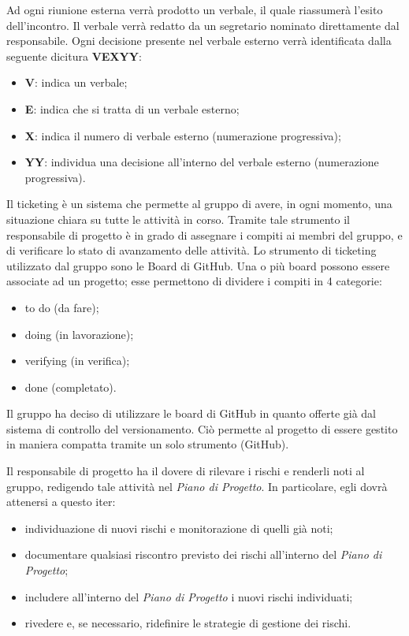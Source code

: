 				Ad ogni riunione esterna verrà prodotto un verbale, il quale riassumerà l'esito dell'incontro. Il verbale verrà redatto da un segretario nominato direttamente dal responsabile. Ogni decisione presente nel verbale esterno verrà identificata dalla seguente dicitura \textbf{VEXYY}:
				\begin{itemize}
					\item\textbf{V}: indica un verbale;
					\item\textbf{E}: indica che si tratta di un verbale esterno;
					\item\textbf{X}: indica il numero di verbale esterno (numerazione progressiva);
					\item\textbf{YY}: individua una decisione all'interno del verbale esterno (numerazione progressiva).
				\end{itemize}
			
			
			
				Il ticketing è un sistema che permette al gruppo di avere, in ogni momento, una situazione chiara su tutte le attività in corso. Tramite tale strumento il responsabile di progetto è in grado di assegnare i compiti ai membri del gruppo, e di verificare lo stato di avanzamento delle attività. Lo strumento di ticketing utilizzato dal gruppo sono le Board di GitHub. Una o più board possono essere associate ad un progetto; esse permettono di dividere i compiti in 4 categorie:
					\begin{itemize}
						\item to do (da fare);
						\item doing (in lavorazione);
						\item verifying (in verifica);
						\item done (completato).
					\end{itemize}
				Il gruppo ha deciso di utilizzare le board di GitHub in quanto offerte già dal sistema di controllo del versionamento. Ciò permette al progetto di essere gestito in maniera compatta tramite un solo strumento (GitHub).
			
			
			Il responsabile di progetto ha il dovere di rilevare i rischi e renderli noti al gruppo, redigendo tale attività nel \textit{Piano di Progetto}. In particolare, egli dovrà attenersi a questo iter:
			\begin{itemize}
				\item individuazione di nuovi rischi e monitorazione di quelli già noti;
				\item documentare qualsiasi riscontro previsto dei rischi all'interno del \textit{Piano di Progetto};
				\item includere all'interno del \textit{Piano di Progetto} i nuovi rischi individuati;
				\item rivedere e, se necessario, ridefinire le strategie di gestione dei rischi.
			\end{itemize}
			
